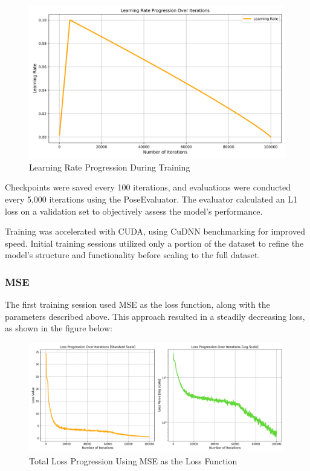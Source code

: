 \begin{figure}[H]
    \centering
    \includegraphics[width=0.75\linewidth]{LateX//figs/learning_rate_progression.png}
    \caption{Learning Rate Progression During Training}
    \label{fig:learning-rate-progression}
\end{figure}

Checkpoints were saved every 100 iterations, and evaluations were conducted every 5,000 iterations using the PoseEvaluator. The evaluator calculated an L1 loss on a validation set to objectively assess the model’s performance.

Training was accelerated with CUDA, using CuDNN benchmarking for improved speed. Initial training sessions utilized only a portion of the dataset to refine the model’s structure and functionality before scaling to the full dataset.

\subsubsection*{MSE}
The first training session used MSE as the loss function, along with the parameters described above. This approach resulted in a steadily decreasing loss, as shown in the figure below:

\begin{figure}[H]
    \centering
    \includegraphics[width=1\linewidth]{LateX//figs/loss_total_mse_progression_comparison.png}
    \caption{Total Loss Progression Using MSE as the Loss Function}
    \label{fig:mse-loss-progression}
\end{figure}

